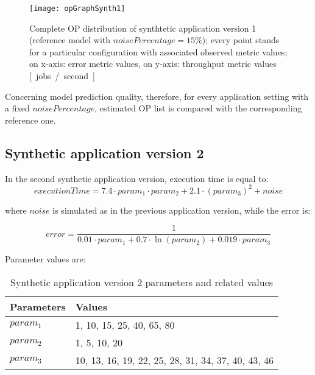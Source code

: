 \begin{figure}[h]

    \centering
    \texttt{[image: opGraphSynth1]}
    \caption[Complete OP distribution of synthtetic application version 1]{Complete OP distribution of synthtetic application version 1 (reference model with $noisePercentage = 15\%$); every point stands for a particular configuration with associated observed metric values; on x-axis: error metric values, on y-axis: throughput metric values \hbox{[ jobs / second ]}}
    \label{fig::opListSynth1}
    
\end{figure}

Concerning model prediction quality, therefore, for every application setting with a fixed $noisePercentage$, estimated OP list is compared with the corresponding reference one.


\subsection{Synthetic application version 2}

In the second synthetic application version, execution time is equal to:
\[
executionTime = 7.4 \cdot param_1 \cdot param_2 + 2.1 \cdot (param_3)^2 + noise
\]

where $noise$ is simulated as in the previous application version, while the error is:

\[
error = \dfrac{1}{0.01 \cdot param_1 + 0.7 \cdot \ln{(param_2)} + 0.019 \cdot param_3}
\]

Parameter values are:

\begin{table}[h]

    \centering

    \begin{tabular}{ll}
    
        \toprule
        Parameters & Values \\
        \midrule
        $param_1$ & 1, 10, 15, 25, 40, 65, 80 \\
        $param_2$ & 1, 5, 10, 20 \\
        $param_3$ & 10, 13, 16, 19, 22, 25, 28, 31, 34, 37, 40, 43, 46 \\
        \bottomrule 
    
    \end{tabular}

    \caption{Synthetic application version 2 parameters and related values}

\end{table}

